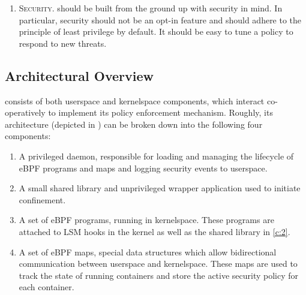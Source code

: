 \begin{enumerate}[label=\bfseries D\arabic*., ref=D\arabic*, labelindent=1em]
  \item \label{d:5} \textsc{Security.}
    \bpfcontain{} should be built from the ground up with security in mind. In
    particular, security should not be an opt-in feature and \bpfcontain{} should
    adhere to the principle of least privilege \cite{saltzer1975_protection} by
    default. It should be easy to tune a \bpfcontain{} policy to respond to new
    threats.
\end{enumerate}

\subsection{Architectural Overview}
\label{sub:architecture}

\bpfcontain{} consists of both userspace and kernelspace components, which interact co-operatively to implement its policy enforcement mechanism. Roughly, its architecture (depicted in ) can be broken down into the following four components:
\begin{enumerate}[label=\bfseries C\arabic*., ref=C\arabic*, labelindent=1em]
  \item \label{c:1}
    A privileged daemon, responsible for loading and managing the lifecycle of eBPF programs and maps and logging security events to userspace.

  \item \label{c:2}
    A small shared library and unprivileged wrapper application used to initiate confinement.

  \item \label{c:3}
  A set of eBPF programs, running in kernelspace. These programs are attached to LSM hooks in the kernel as well as the shared library in \ref{c:2}.

  \item \label{c:4}
  A set of eBPF maps, special data structures which allow bidirectional communication between userspace and kernelspace. These maps are used to track the state of running containers and store the active security policy for each container.
\end{enumerate}

